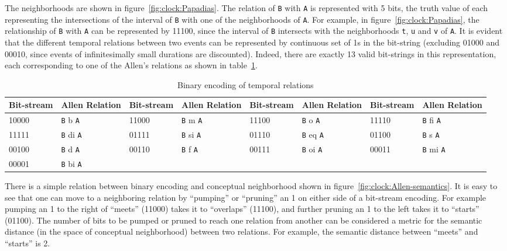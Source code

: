\noindent
The neighborhoods are shown in figure~\ref{fig:clock:Papadias}. The relation of \texttt{B} with \texttt{A} is represented
with 5 bits, the truth value of each representing the intersections of the interval of \texttt{B} with one of the neighborhoods of 
\texttt{A}. For example, in figure~\ref{fig:clock:Papadias}, the relationship of \texttt{B} with \texttt{A} can be represented
by 11100, since the interval of \texttt{B} intersects with the neighborhoods \texttt{t}, \texttt{u} and \texttt{v} of \texttt{A}.
It is evident that the different temporal relations between two events can be represented by continuous set of 1s in the bit-string
(excluding 01000 and 00010, since events of infinitesimally small durations are discounted). Indeed, there are exactly 13 valid
bit-strings in this representation, each corresponding to one of the Allen's relations as shown in table~\ref{tab:clock:Papadias}.

\begin{table}
	\footnotesize
	\caption{Binary encoding of temporal relations \label{tab:clock:Papadias}} {
		\begin{tabular}{p{10mm} p{10mm} |   p{10mm} p{10mm} |  p{10mm} p{10mm} | p{10mm} p{10 mm}} 
		\hline
		Bit-stream & Allen Relation & Bit-stream & Allen Relation & Bit-stream & Allen Relation 
			& Bit-stream & Allen Relation \\ 
		\hline
		10000 & \texttt{B} b  \texttt {A} & 11000 & \texttt{B} m  \texttt {A} & 11100 & \texttt{B} o  \texttt {A} 
			& 11110 & \texttt{B} fi \texttt {A} \\
		11111 & \texttt{B} di \texttt {A} & 01111 & \texttt{B} si \texttt {A} &  01110 & \texttt{B} eq \texttt {A} 
			& 01100 & \texttt{B} s  \texttt {A} \\
		00100 & \texttt{B} d \texttt {A} & 00110 & \texttt{B} f  \texttt {A}  & 00111 & \texttt{B} oi \texttt {A} 
			& 00011 & \texttt{B} mi \texttt {A}  \\
		00001 & \texttt{B} bi \texttt {A} & & & & & & \\
		\hline
		\end{tabular}
	}{}
\end{table}

There is a simple relation between binary encoding and conceptual neighborhood shown in figure~\ref{fig:clock:Allen-semantics}. 
It is easy to see that one can move to a neighboring relation by ``pumping'' or ``pruning'' an 1 on either side of a bit-stream encoding.
For example pumping an 1 to the right of ``meets'' (11000) takes it to ``overlaps'' (11100), and further pruning an 1 to the left takes 
it to ``starts'' (01100).
% 
%
The number of bits to be pumped or pruned to reach one relation from another can be considered a metric for the semantic distance 
(in the space of conceptual neighborhood) between two relations. For example, the semantic distance between ``meets'' and ``starts'' 
is 2.
 
